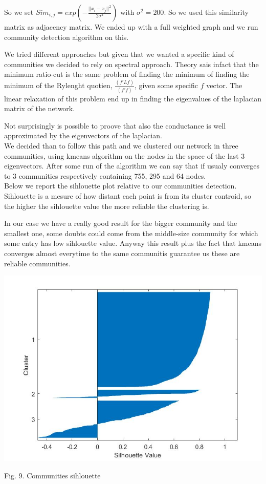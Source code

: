 \documentclass{article}%
\begin{document}
So we set $Sim_{i,j}= exp(- \frac{||x_i-x_j||^2}{2\sigma^2})$ with $\sigma^2=200$. So we used this similarity matrix as adjacency matrix. We ended up with a full weighted graph and we run community detection algorithm on this.

We tried different approaches but given that we wanted a specific kind of communities we decided to rely on spectral approach. Theory sais infact that the minimum ratio-cut is the same problem of finding the minimum of finding the minimum of the Rylenght quotien, $\frac{(f'Lf)}{(f'f)}$, given some specific $f$ vector. The linear relaxation of this problem end up in finding the eigenvalues of the laplacian matrix of the network.

Not surprisingly is possible to proove that also the conductance is well approximated by the eigenvectors of the laplacian.
\\

We decided than to follow this path and we clustered our network in three communities, using kmeans algorithm on the nodes in the space of the last 3 eigenvectors. After some run of the algorithm we can say that if usualy converges to 3 communities respectively containing 755, 295 and 64 nodes.
\\

Below we report the sihlouette plot relative to our communities detection. Sihlouette is a mesure of how distant each point is from its cluster controid, so the higher the sihlouette value the more reliable the clustering is.

In our case we have a really good result for the bigger community and the smallest one, some doubts could come from the middle-size community for which some entry has low sihlouette value. Anyway this result plus the fact that kmeans converges almost everytime to the same communitis guarantee us these are reliable communities.

\includegraphics[scale=0.5]{sihlouette}
\begin{center}
\begin{small}
Fig. 9. Communities sihlouette
\end{small}
\end{center}
~
\\
\end{document}
